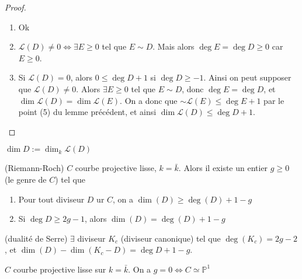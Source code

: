             \begin{proof}
                \begin{enumerate}
                    \item Ok
                    \item $\mathcal{L}(D) \neq 0 \iff \exists E \geq 0$ tel que $E \sim D$. Mais alors $\deg E = \deg D \geq 0$ car $E \geq 0$.
                    \item Si $\mathcal{L}(D) = 0$, alors $0 \leq \deg D + 1$ si $\deg D \geq -1$. Ainsi on peut supposer que $\mathcal{L}(D) \neq 0$. Alors $\exists E \geq 0$ tel que $E \sim D$, donc $\deg E = \deg D$, et $\dim \mathcal{L}(D) = \dim \mathcal{L}(E)$. On a donc que $\sim \mathcal{L}(E) \leq \deg E + 1$ par le point (5) du lemme précédent, et ainsi $\dim \mathcal{L}(D) \leq \deg D + 1$.
                \end{enumerate}
            \end{proof}
            \begin{nota}
                $\dim D := \dim_k \mathcal{L}(D)$
            \end{nota}
            \begin{theo} (Riemann-Roch)
                \label{RR}
                $C$ courbe projective lisse, $k = \bar k$. Alors il existe un entier $g \geq 0$ (le genre de $C$) tel que 
                \begin{enumerate}
                    \item Pour tout diviseur $D$ ur $C$, on a $\dim(D) \geq \deg(D) + 1 - g$
                    \item Si $\deg D \geq 2g - 1$, alors $\dim(D) = \deg(D) + 1 - g$
                \end{enumerate}
            \end{theo}
            \begin{theo} (dualité de Serre)
                $\exists$ diviseur $K_c$ (diviseur canonique) tel que $\deg(K_c) = 2g - 2$, et $\dim(D) - \dim(K_c - D) = \deg D + 1 - g$.
            \end{theo}
            \begin{theo}
                $C$ courbe projective lisse sur $k = \bar k$. On a $g = 0 \iff C \simeq \mathbb{P}^1$
            \end{theo}
